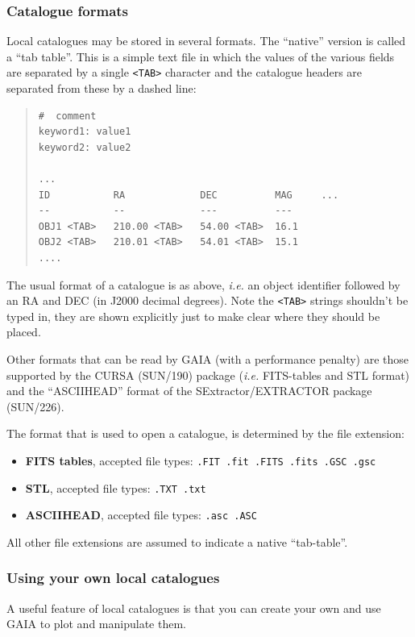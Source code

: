 \documentclass[twoside,11pt]{article}
\newcommand{\xref}[3]{#1}
\renewcommand{\_}{\texttt{\symbol{95}}}
\newcommand{\mytt}[1]{{\tt{#1}}}
\begin{document}
\subsubsection{Catalogue formats}
Local catalogues may be stored in several formats. The ``native''
version is called a ``tab table''. This is a simple text file in which
the values of the various fields are separated by a single
\mytt{<TAB>} character and the catalogue headers are separated from
these by a dashed line:
\begin{quote}
\begin{verbatim}
#  comment
keyword1: value1
keyword2: value2

...
ID           RA             DEC          MAG     ...
--           --             ---          ---
OBJ1 <TAB>   210.00 <TAB>   54.00 <TAB>  16.1
OBJ2 <TAB>   210.01 <TAB>   54.01 <TAB>  15.1
....
\end{verbatim}
\end{quote}
The usual format of a catalogue is as above, {\em i.e.} an object identifier
followed by an RA and DEC (in J2000 decimal degrees). Note the
\mytt{<TAB>} strings shouldn't be typed in, they are shown explicitly
just to make clear where they should be placed.

Other formats that can be read by GAIA (with a performance penalty)
are those supported by the CURSA (\xref{SUN/190}{sun190}{}) package
({\em i.e.} FITS-tables and STL format) and the ``ASCII\_HEAD'' format of
the SExtractor/EXTRACTOR package (\xref{SUN/226}{sun226}{}).

The format that is used to open a catalogue, is determined by the file
extension:
\begin{itemize}
\item \textbf{FITS tables}, accepted file types: \texttt{.FIT .fit .FITS .fits .GSC .gsc}
\item \textbf{STL}, accepted file types: \texttt{.TXT .txt}
\item \textbf{ASCII\_HEAD}, accepted file types: \texttt{.asc .ASC}
\end{itemize}
All other file extensions are assumed to indicate a native ``tab-table''.

\subsubsection{Using your own local catalogues}
A useful feature of local catalogues is that you can create your own
and use GAIA to plot and manipulate them.
\end{document}
